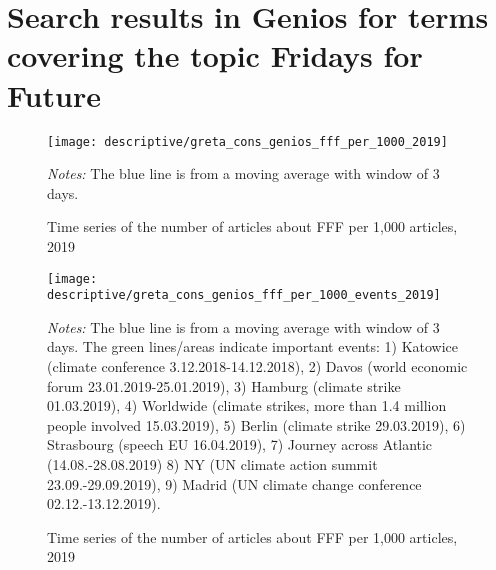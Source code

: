 \documentclass[11pt, a4paper]{article} %
\begin{document}
\newpage
\section{Search results in Genios for terms covering the topic Fridays for Future}


\begin{figure}[H]\centering
	\caption{Time series of the number of articles about FFF per 1,000 articles, 2019}
	\texttt{[image: descriptive/greta\_cons\_genios\_fff\_per\_1000\_2019]}
	\begin{minipage}{\linewidth}
		\scriptsize{\emph{Notes:} The blue line is from a moving average with window of 3 days.}
	\end{minipage}
\end{figure}


\begin{figure}[H]\centering
	\caption{Time series of the number of articles about FFF per 1,000 articles, 2019}
	\texttt{[image: descriptive/greta\_cons\_genios\_fff\_per\_1000\_events\_2019]}
	\begin{minipage}{\linewidth}
		\scriptsize{\emph{Notes:} The blue line is from a moving average with window of 3 days. The green lines/areas indicate important events: 1) Katowice (climate conference 3.12.2018-14.12.2018), 2) Davos (world economic forum 23.01.2019-25.01.2019), 3) Hamburg (climate strike 01.03.2019), 4) Worldwide (climate strikes, more than 1.4 million people involved 15.03.2019), 5) Berlin (climate strike 29.03.2019), 6) Strasbourg (speech EU 16.04.2019), 7) Journey across Atlantic (14.08.-28.08.2019) 8) NY (UN climate action summit 23.09.-29.09.2019), 9) Madrid (UN climate change conference 02.12.-13.12.2019).}
	\end{minipage}
\end{figure}
\end{document}
